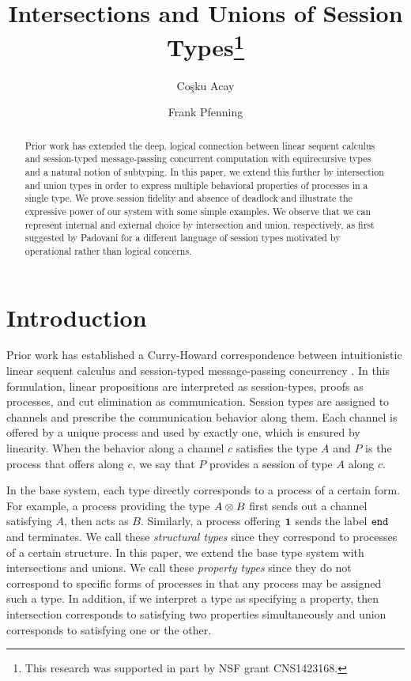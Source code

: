 \documentclass[a4paper,USenglish]{lipics-v2016}
\title{Intersections and Unions of Session Types\footnote{This research was supported in part by NSF grant CNS1423168.}}
\author[1]{Co\c{s}ku Acay}
\author[2]{Frank Pfenning}
\affil[1]{Carnegie Mellon University, Pittsburgh, PA 15213 \\
  \texttt{cacay@cmu.edu}}
\affil[2]{Carnegie Mellon University, Pittsburgh, PA 15213 \\
  \texttt{fp@cs.cmu.edu}}
\begin{document}
\maketitle

\begin{abstract}
  Prior work has extended the deep, logical connection between linear
  sequent calculus and session-typed message-passing concurrent
  computation with equirecursive types and a natural notion of
  subtyping. In this paper, we extend this further by intersection and
  union types in order to express multiple behavioral properties of
  processes in a single type. We prove session fidelity and absence of
  deadlock and illustrate the expressive power of our system with some
  simple examples. We observe that we can represent internal and
  external choice by intersection and union, respectively, as first
  suggested by Padovani for a different language of session types
  motivated by operational rather than logical concerns.
\end{abstract}


\section{Introduction}

Prior work has established a Curry-Howard correspondence between intuitionistic linear sequent calculus and session-typed message-passing concurrency \cite{CairesP10, PfenningG15, Honda93}. In this formulation, linear propositions are interpreted as session-types, proofs as processes, and cut elimination as communication. Session types are assigned to channels and prescribe the communication behavior along them. Each channel is offered by a unique process and used by exactly one, which is ensured by linearity. When the behavior along a channel $c$ satisfies the type $A$ and $P$ is the process that offers along $c$, we say that $P$ provides a session of type $A$ along $c$.

In the base system, each type directly corresponds to a process of a certain form. For example, a process providing the type $A \otimes B$ first sends out a channel satisfying $A$, then acts as $B$. Similarly, a process offering $\mathbf{1}$ sends the label $\texttt{end}$ and terminates. We call these \emph{structural types} since they correspond to processes of a certain structure. In this paper, we extend the base type system with intersections and unions. We call these \emph{property types} since they do not correspond to specific forms of processes in that any process may be assigned such a type. In addition, if we interpret a type as specifying a property, then intersection corresponds to satisfying two properties simultaneously and union corresponds to satisfying one or the other.
\end{document}
